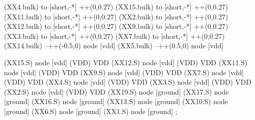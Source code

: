 \begin{circuitikz}[american]
	(XX4.bulk) to [short,-*] ++(0,0.27)
	(XX15.bulk) to [short,-*] ++(0,0.27)
	(XX11.bulk) to [short,-*] ++(0,0.27)
	(XX2.bulk) to [short,-*] ++(0,0.27)
	(XX12.bulk) to [short,-*] ++(0,0.27)
	(XX9.bulk) to [short,-*] ++(0,0.27)
	(XX3.bulk) to [short,-*] ++(0,0.27)
	(XX7.bulk) to [short,-*] ++(0,0.27)
	(XX14.bulk) --++(-0.5,0) node [vdd]{}
	(XX5.bulk) --++(0.5,0) node [vdd]{}
	
 

	(XX15.S) node [vdd] (VDD) {VDD}
	(XX12.S) node [vdd] (VDD) {VDD}
	(XX11.S) node [vdd] (VDD) {VDD}
	(XX9.S) node [vdd] (VDD) {VDD}
	(XX7.S) node [vdd] (VDD) {VDD}
	(XX4.S) node [vdd] (VDD) {VDD}
	(XX3.S) node [vdd] (VDD) {VDD}
	(XX2.S) node [vdd] (VDD) {VDD}
	(XX19.S) node [ground] {}
	(XX17.S) node [ground] {}
	(XX16.S) node [ground] {}
	(XX13.S) node [ground] {}
	(XX10.S) node [ground] {}
	(XX6.S) node [ground] {}
	(XX1.S) node [ground] {}
;

\end{circuitikz}
